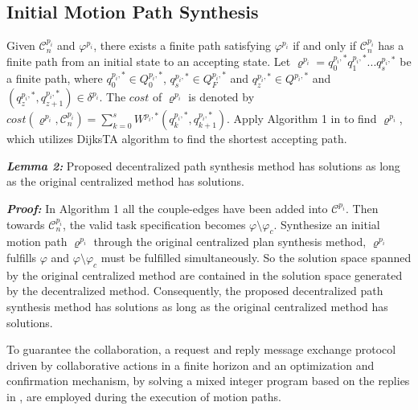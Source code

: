 \documentclass[journal]{IEEEtran}
\begin{document}
\subsection{Initial Motion Path Synthesis}
Given $\mathcal{C}^{p_i}_n$ and $\varphi^{p_i}$, there exists a finite path satisfying $\varphi^{p_i}$ if and only if $\mathcal{C}^{p_i}_n$ has a finite path from an initial state to an accepting state. Let $\varrho^{p_i}=q^{p_i,\ast}_0 q^{p_i,\ast}_1 ... q^{p_i,\ast}_s$ be a finite path, where $q^{p_i,\ast}_0\in Q^{p_i,\ast}_0$, $q^{p_i,\ast}_s\in Q^{p_i,\ast}_F$ and $q^{p_i,\ast}_z\in Q^{p_i,\ast}$ and $(q^{p_i,\ast}_z,q^{p_i,\ast}_{z+1})\in \delta^{p_i}$. The $cost$ of $\varrho^{p_i}$ is denoted by $cost(\varrho^{p_i},\mathcal{C}^{p_i}_n)=\sum^{s}_{k=0}W^{p_i,\ast}(q^{p_i,\ast}_k,q^{p_i,\ast}_{k+1})$. Apply Algorithm 1 in \cite{guo2013motion} to find $\varrho^{p_i}$, which utilizes DijksTA algorithm to find the shortest accepting path.

\textbf{\emph{Lemma 2:}} Proposed decentralized path synthesis method has solutions as long as the original centralized method has solutions.\par
\textbf{\emph{Proof:}} In Algorithm 1 all the couple-edges have been added into $\mathcal{C}^{p_i}$. Then towards $\mathcal{C}^{p_i}_n$, the valid task specification becomes $\varphi \setminus \varphi_c$. Synthesize an initial motion path $\varrho^{p_i}$ through the original centralized plan synthesis method, $\varrho^{p_i}$ fulfills $\varphi$ and $\varphi \setminus \varphi_c$ must be fulfilled simultaneously. So the solution space spanned by the original centralized method are contained in the solution space generated by the decentralized method. Consequently, the proposed decentralized path synthesis method has solutions as long as the original centralized method has solutions.\par

To guarantee the collaboration, a request and reply message exchange protocol driven by
collaborative actions in a finite horizon and an optimization and
confirmation mechanism, by solving a mixed integer program
based on the replies in \cite{guo2017task}, are employed during the execution of motion paths.
%
\end{document}
